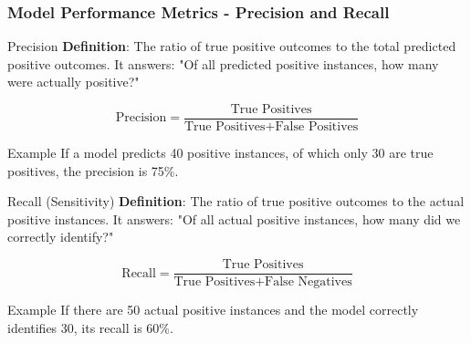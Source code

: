 \documentclass[aspectratio=169]{beamer}
\begin{document}
\begin{frame}[fragile]
    \frametitle{Model Performance Metrics - Precision and Recall}
    \begin{block}{Precision}
        \textbf{Definition}: The ratio of true positive outcomes to the total predicted positive outcomes. It answers: "Of all predicted positive instances, how many were actually positive?"
        
        \begin{equation}
            \text{Precision} = \frac{\text{True Positives}}{\text{True Positives} + \text{False Positives}}
        \end{equation}
        
        \begin{block}{Example}
            If a model predicts 40 positive instances, of which only 30 are true positives, the precision is 75\%.
        \end{block}
    \end{block}
    
    \begin{block}{Recall (Sensitivity)}
        \textbf{Definition}: The ratio of true positive outcomes to the actual positive instances. It answers: "Of all actual positive instances, how many did we correctly identify?"
        
        \begin{equation}
            \text{Recall} = \frac{\text{True Positives}}{\text{True Positives} + \text{False Negatives}}
        \end{equation}
        
        \begin{block}{Example}
            If there are 50 actual positive instances and the model correctly identifies 30, its recall is 60\%.
        \end{block}
    \end{block}
\end{frame}
\end{document}
